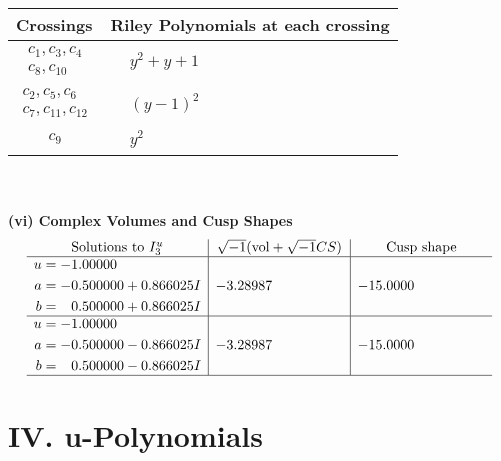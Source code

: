 \documentclass[1p]{elsarticle_modified}
\theoremstyle{definition}
\newcommand{\I}{\sqrt{-1}}
\begin{document}
\begin{tabular}{m{50pt}|m{274pt}}
Crossings & \hspace{64pt}Riley Polynomials at each crossing \\
\hline $$\begin{aligned}c_{1},c_{3},c_{4}\\c_{8},c_{10}\end{aligned}$$&$\begin{aligned}
&y^2+y+1
\end{aligned}$\\
\hline $$\begin{aligned}c_{2},c_{5},c_{6}\\c_{7},c_{11},c_{12}\end{aligned}$$&$\begin{aligned}
&(y-1)^2
\end{aligned}$\\
\hline $$\begin{aligned}c_{9}\end{aligned}$$&$\begin{aligned}
&y^2
\end{aligned}$\\
\hline
\end{tabular}\\~\\
\newpage\flushleft \textbf{(vi) Complex Volumes and Cusp Shapes}
$$\begin{array}{c|c|c}  
\text{Solutions to }I^u_{3}& \I (\text{vol} + \sqrt{-1}CS) & \text{Cusp shape}\\
 \hline 
\begin{aligned}
u &= -1.00000\phantom{ +0.000000I} \\
a &= -0.500000 + 0.866025 I \\
b &= \phantom{-}0.500000 + 0.866025 I\end{aligned}
 & -3.28987\phantom{ +0.000000I} & -15.0000\phantom{ +0.000000I} \\ \hline\begin{aligned}
u &= -1.00000\phantom{ +0.000000I} \\
a &= -0.500000 - 0.866025 I \\
b &= \phantom{-}0.500000 - 0.866025 I\end{aligned}
 & -3.28987\phantom{ +0.000000I} & -15.0000\phantom{ +0.000000I}\\
 \hline 
 \end{array}$$\newpage
\newpage\renewcommand{\arraystretch}{1}
\centering \section*{ IV. u-Polynomials}
\end{document}
